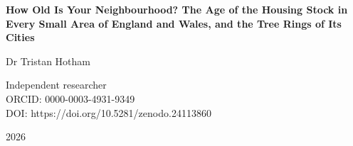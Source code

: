 \documentclass[11pt,a4paper]{article}
\begin{document}
\begin{center}
{\Large\bfseries How Old Is Your Neighbourhood? The Age of the Housing Stock in Every Small Area of England and Wales, and the Tree Rings of Its Cities\par}
\vspace{1.2em}
{\large Dr Tristan Hotham\par}
\vspace{0.3em}
{\small Independent researcher\\
ORCID: 0000-0003-4931-9349\\
DOI: https://doi.org/10.5281/zenodo.24113860\par}
\vspace{0.8em}
2026
\end{center}

\end{document}
